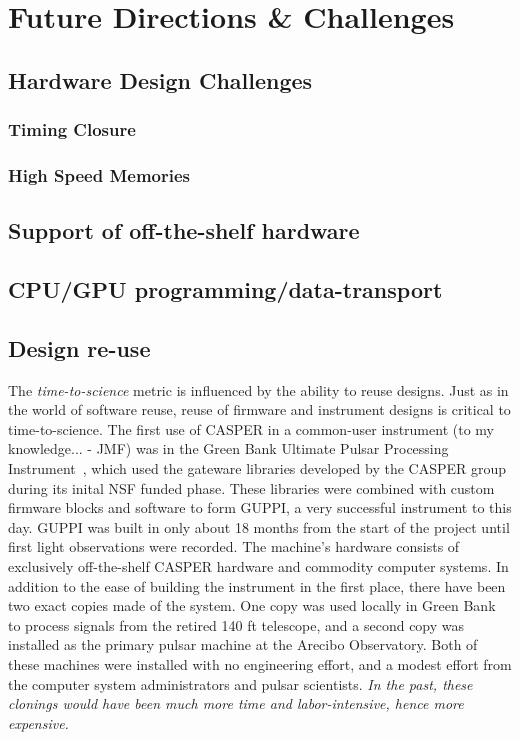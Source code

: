 \documentclass{ws-jai}
\begin{document}
\section{Future Directions \& Challenges} \label{sec:Future}

\subsection{Hardware Design Challenges}

\subsubsection{Timing Closure}

\subsubsection{High Speed Memories} \label{sec: HSM}


\subsection{Support of off-the-shelf hardware}

\subsection{CPU/GPU programming/data-transport}

\subsection{Design re-use}
The \emph{time-to-science} metric is influenced by the ability to
reuse designs. Just as in the world of software reuse, reuse of
firmware and instrument designs is critical to time-to-science. The
first use of CASPER in a common-user instrument (to my knowledge... -
JMF) was in the Green Bank Ultimate Pulsar Processing
Instrument~\cite{guppi}, which used the gateware libraries
developed by the CASPER group during its inital NSF funded phase.
These libraries were combined with custom firmware blocks and software
to form GUPPI, a very successful instrument to this day.  GUPPI was
built in only about 18 months from the start of the project until
first light observations were recorded.  The machine's hardware
consists of exclusively off-the-shelf CASPER hardware and commodity
computer systems.  In addition to the ease of building the instrument
in the first place, there have been two exact copies made of the
system.  One copy was used locally in Green Bank to process signals
from the retired 140 ft telescope, and a second copy was installed as
the primary pulsar machine at the Arecibo Observatory.  Both of these
machines were installed with no engineering effort, and a modest
effort from the computer system administrators and pulsar scientists.
\emph{In the past, these clonings would have been much more time and
  labor-intensive, hence more expensive.}
\end{document}
